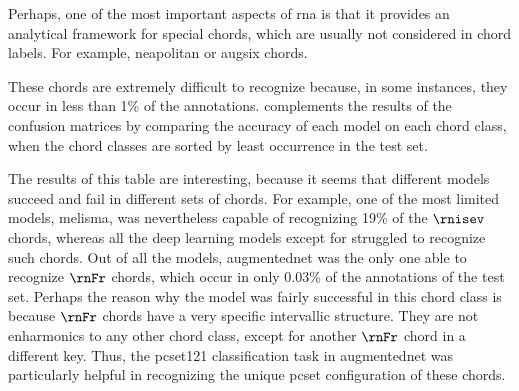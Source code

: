 
Perhaps, one of the most important aspects of \gls{rna} is
that it provides an analytical framework for special chords,
which are usually not considered in chord labels. For
example, \gls{neapolitan} or \gls{augsix} chords.

These chords are extremely difficult to recognize because,
in some instances, they occur in less than 1\% of the
annotations.  complements the results of
the confusion matrices by comparing the accuracy of each
model on each chord class, when the chord classes are sorted
by least occurrence in the test set.

The results of this table are interesting, because it seems
that different models succeed and fail in different sets of
chords. For example, one of the most limited models,
\gls{melisma}, was nevertheless capable of recognizing 19\%
of the $\rnisev$ chords, whereas all the deep learning
models except for \textcite{mcleod2021modular} struggled to
recognize such chords. Out of all the models,
\gls{augmentednet} was the only one able to recognize $\rnFr$
chords, which occur in only 0.03\% of the annotations of the
test set. Perhaps the reason why the model was fairly
successful in this chord class is because $\rnFr$ chords
have a very specific intervallic structure. They are not
enharmonics to any other chord class, except for another
$\rnFr$ chord in a different key. Thus, the \gls{pcset121}
classification task in \gls{augmentednet} was particularly
helpful in recognizing the unique \gls{pcset} configuration
of these chords.


